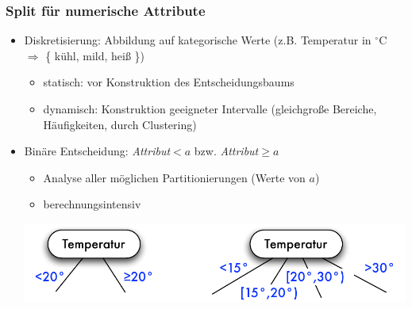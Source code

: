 \begin{frame}
\frametitle{Split für numerische Attribute}

\begin{itemize}
\item Diskretisierung: Abbildung auf kategorische Werte
  (z.B. Temperatur in $^\circ$C $\Longrightarrow$ \{ kühl, mild, heiß
  \})
\begin{itemize}
\item statisch: vor Konstruktion des Entscheidungsbaums
\item dynamisch: Konstruktion geeigneter Intervalle (gleichgroße
  Bereiche, Häufigkeiten, durch Clustering)
\end{itemize}
\item Binäre Entscheidung: \emph{Attribut}$< a$
  bzw. \emph{Attribut}$\geq a$
\begin{itemize}
\item Analyse aller möglichen Partitionierungen (Werte von $a$)
\item berechnungsintensiv
\end{itemize}

\begin{center}
\includegraphics[scale=.5]{fig7/split-num.pdf}
\end{center}
\end{itemize}

\end{frame}


